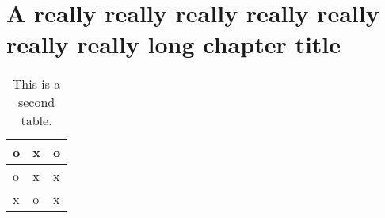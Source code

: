 \chapter{A really really really really really really really long chapter title}

\lipsum[3]

\begin{table}[h]
\centering
\begin{tabular}{|l|l|l|}
\hline
 o & x & o \\ \hline
 o & x & x  \\ \hline
 x & o & x \\ \hline
\end{tabular}
\caption{This is a second table.}
\end{table}